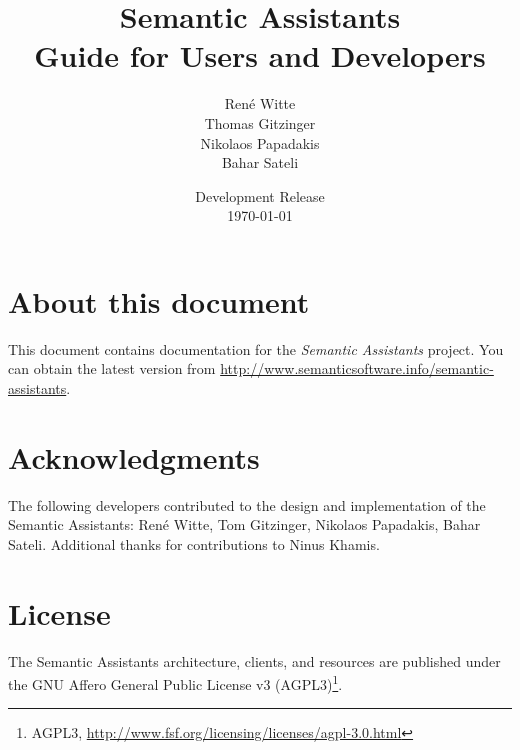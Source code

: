 \documentclass[10pt,twoside,openany,chapterprefix]{scrbook}
\title{Semantic Assistants\bigskip\\
\Large Guide for Users and Developers}
\author{Ren\'{e} Witte\\
Thomas Gitzinger\\
Nikolaos Papadakis\\
Bahar Sateli
\medskip}
\date{Development Release\\
\today
}
\begin{document}
\frontmatter
\maketitle
\tableofcontents

\section*{About this document}
This document contains documentation for the \emph{Semantic
  Assistants} project. You can obtain the latest version from
\url{http://www.semanticsoftware.info/semantic-assistants}.

\section*{Acknowledgments}
The following developers contributed to the design and implementation
of the Semantic Assistants: Ren\'{e} Witte, Tom
Gitzinger, Nikolaos Papadakis, Bahar Sateli. Additional thanks for contributions
to Ninus Khamis.

\section*{License}
The Semantic Assistants architecture, clients, and resources are
published under the GNU Affero General Public License v3
(AGPL3)\footnote{AGPL3,
  \url{http://www.fsf.org/licensing/licenses/agpl-3.0.html}}.

\mainmatter






\backmatter
\appendix


\end{document}
